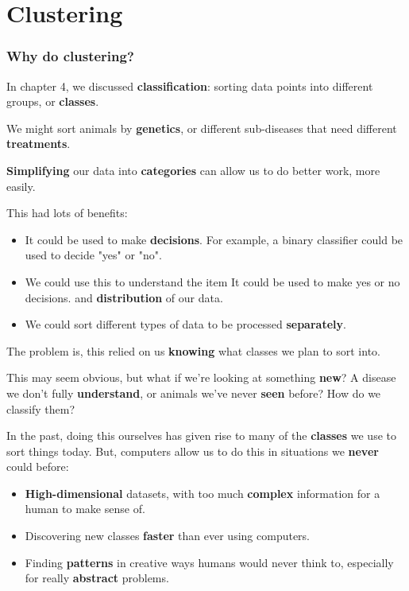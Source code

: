 
\chapter*{Clustering}

    \subsection*{Why do clustering?}
    
        In chapter 4, we discussed \textbf{classification}: sorting data points into different groups, or \textbf{classes}. 
        
        \miniex We might sort animals by \textbf{genetics}, or different sub-diseases that need different \textbf{treatments}. 
        
        \textbf{Simplifying} our data into \textbf{categories} can allow us to do better work, more easily.
        
        This had lots of benefits: 
        
        \begin{itemize}
            \item It could be used to make \textbf{decisions}. For example, a binary classifier could be used to decide "yes" or "no". 
        
            \item We could use this to understand the item It could be used to make yes or no decisions. and \textbf{distribution} of our data.
            
            \item We could sort different types of data to be processed \textbf{separately}.
        \end{itemize}
        
        The problem is, this relied on us \textbf{knowing} what classes we plan to sort into. 
        
        This may seem obvious, but what if we're looking at something \textbf{new}? A disease we don't fully \textbf{understand}, or animals we've never \textbf{seen} before? How do we classify them?
        
        In the past, doing this ourselves has given rise to many of the \textbf{classes} we use to sort things today. But, computers allow us to do this in situations we \textbf{never} could before:
        
        \begin{itemize}
            \item \textbf{High-dimensional} datasets, with too much \textbf{complex} information for a human to make sense of.
            
            \item Discovering new classes \textbf{faster} than ever using computers.
            
            \item Finding \textbf{patterns} in creative ways humans would never think to, especially for really \textbf{abstract} problems.\\
        \end{itemize}
    

